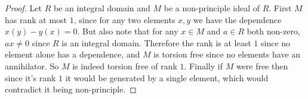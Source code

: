 \documentclass[11pt]{article}
\begin{document}
\begin{proof}
  Let $R$ be an integral domain and $M$ be a non-principle ideal of $R$.
  First $M$ has rank at most $1$, since for any two elements $x,y$ we have the dependence $x(y) - y(x) = 0$.
  But also note that for any $x \in M$ and $a \in R$ both non-zero, $ax \ne 0$ since $R$ is an integral domain.
  Therefore the rank is at least $1$ since no element alone has a dependence, and $M$ is torsion free since no elements have an annihilator.
  So $M$ is indeed torsion free of rank $1$.
  Finally if $M$ were free then since it's rank $1$ it would be generated by a single element, which would contradict it being non-principle.
\end{proof}
\end{document}
